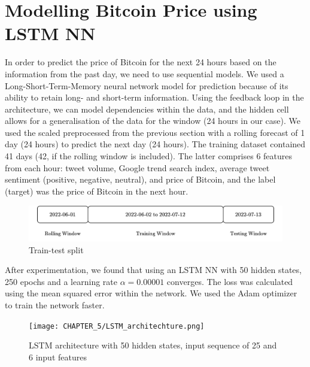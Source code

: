 \section{Modelling Bitcoin Price using LSTM NN}
In order to predict the price of Bitcoin for the next 24 hours based on the information from the past day, we need to use sequential models. We used a Long-Short-Term-Memory neural network model for prediction because of its ability to retain long- and short-term information. Using the feedback loop in the architecture, we can model dependencies within the data, and the hidden cell allows for a generalisation of the data for the window (24 hours in our case). We used the scaled preprocessed from the previous section with a rolling forecast of 1 day (24 hours) to predict the next day (24 hours). The training dataset contained 41 days (42, if the rolling window is included). The latter comprises 6 features from each hour: tweet volume, Google trend search index, average tweet sentiment (positive, negative, neutral), and price of Bitcoin, and the label (target) was the price of Bitcoin in the next hour.


\begin{figure}[H]
   \centering
   \includegraphics[scale=0.90]{CHAPTER_5/train_test_split.png}
   \caption{Train-test split}
   \label{train_test_split}
\end{figure}


 \noindent After experimentation, we found that using an LSTM NN with 50 hidden states, 250 epochs and a learning rate $\alpha = 0.00001$ converges. The loss was calculated using the mean squared error within the network. We used the Adam optimizer to train the network faster.

 \begin{figure}[H]
    \centering
    \texttt{[image: CHAPTER\_5/LSTM\_architechture.png]}
    \caption{LSTM architecture with 50 hidden states, input sequence of 25 and 6 input features}
    \label{LSTM_architechture}
 \end{figure}
